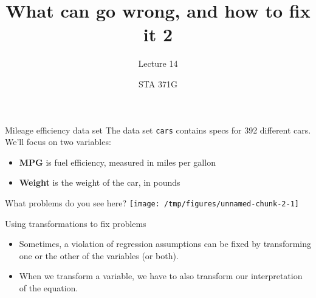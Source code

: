 \documentclass{beamer}\usepackage[]{graphicx}\usepackage[]{color}
\title{What can go wrong, and how to fix it 2}
\subtitle{Lecture 14}
\author{STA 371G}
\newenvironment{knitrout}{}{} %
\begin{document}
  

  \frame{\maketitle}



  \begin{darkframes}
    \begin{frame}
    \end{frame}

    \begin{frame}{Mileage efficiency data set}
      The data set \texttt{cars} contains specs for 392 different cars. We'll focus on two variables:
      \begin{itemize}
        \item \textbf{MPG} is fuel efficiency, measured in miles per gallon
        \item \textbf{Weight} is the weight of the car, in pounds
      \end{itemize}
    \end{frame}

    \begin{frame}[fragile]{What problems do you see here?}
\begin{knitrout}
\color{fgcolor}
\texttt{[image: /tmp/figures/unnamed-chunk-2-1]} 

\end{knitrout}
    \end{frame}

    \begin{frame}[fragile]{Using transformations to fix problems}
      \begin{itemize}
        \item Sometimes, a violation of regression assumptions can be fixed by transforming one or the other of the variables (or both).
        \item When we transform a variable, we have to also transform our interpretation of the equation.
      \end{itemize}
    \end{frame}


\end{darkframes}
\end{document}
